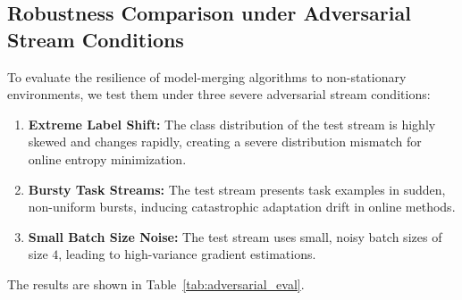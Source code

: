 \subsection{Robustness Comparison under Adversarial Stream Conditions}
To evaluate the resilience of model-merging algorithms to non-stationary environments, we test them under three severe adversarial stream conditions:
\begin{enumerate}
    \item \textbf{Extreme Label Shift:} The class distribution of the test stream is highly skewed and changes rapidly, creating a severe distribution mismatch for online entropy minimization.
    \item \textbf{Bursty Task Streams:} The test stream presents task examples in sudden, non-uniform bursts, inducing catastrophic adaptation drift in online methods.
    \item \textbf{Small Batch Size Noise:} The test stream uses small, noisy batch sizes of size $4$, leading to high-variance gradient estimations.
\end{enumerate}
The results are shown in Table~\ref{tab:adversarial_eval}.

